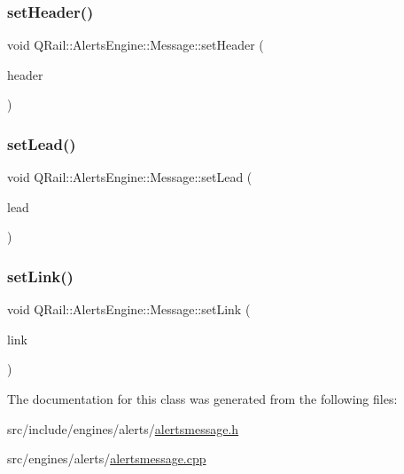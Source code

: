 \mbox{\label{classQRail_1_1AlertsEngine_1_1Message_af952ee41f2bd04126b5c73aa20c8fccc}} 
\subsubsection{\texorpdfstring{setHeader()}{setHeader()}}
{\footnotesize\ttfamily void Q\+Rail\+::\+Alerts\+Engine\+::\+Message\+::set\+Header (\begin{DoxyParamCaption}\item[{const Q\+String \&}]{header }\end{DoxyParamCaption})}

\mbox{\label{classQRail_1_1AlertsEngine_1_1Message_a737ca83ba775f3c836cff2530ff2449d}} 
\subsubsection{\texorpdfstring{setLead()}{setLead()}}
{\footnotesize\ttfamily void Q\+Rail\+::\+Alerts\+Engine\+::\+Message\+::set\+Lead (\begin{DoxyParamCaption}\item[{const Q\+String \&}]{lead }\end{DoxyParamCaption})}

\mbox{\label{classQRail_1_1AlertsEngine_1_1Message_aa4c1f5cd9f81e74b7dd7a43c18e267cf}} 
\subsubsection{\texorpdfstring{setLink()}{setLink()}}
{\footnotesize\ttfamily void Q\+Rail\+::\+Alerts\+Engine\+::\+Message\+::set\+Link (\begin{DoxyParamCaption}\item[{const Q\+Url \&}]{link }\end{DoxyParamCaption})}



The documentation for this class was generated from the following files\+:\begin{DoxyCompactItemize}
\item 
src/include/engines/alerts/\mbox{\hyperlink{alertsmessage_8h}{alertsmessage.\+h}}\item 
src/engines/alerts/\mbox{\hyperlink{alertsmessage_8cpp}{alertsmessage.\+cpp}}\end{DoxyCompactItemize}
